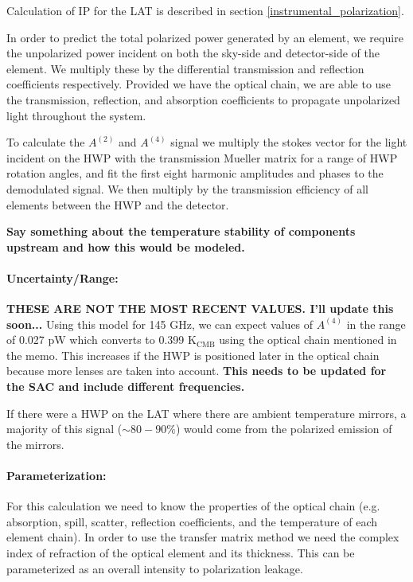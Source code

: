 Calculation of IP for the LAT is described in section \ref{instrumental_polarization}.

In order to predict the total polarized power generated by an element, we require the unpolarized power incident on both the sky-side and detector-side of the element. We multiply these by the differential transmission and reflection coefficients respectively.
Provided we have the optical chain, we are able to use the transmission, reflection, and absorption coefficients to propagate unpolarized light throughout the system.

To calculate the $A^{(2)}$ and $A^{(4)}$ signal we multiply the stokes vector for the light incident on the HWP with the transmission Mueller matrix for a range of HWP rotation angles, and fit the first eight harmonic amplitudes and phases to the demodulated signal. 
We then multiply by the transmission efficiency of all elements between the HWP and the detector.

\textbf{Say something about the temperature stability of components upstream and how this would be modeled.}

\paragraph{Uncertainty/Range:} \textbf{THESE ARE NOT THE MOST RECENT VALUES. I'll update this soon...}
Using this model for 145 GHz, we can expect values of $A^{(4)}$ in the range of 0.027 pW which converts to 0.399 K$_\text{CMB}$ using the optical chain mentioned in the memo. This increases if the HWP is positioned later in the optical chain because more lenses are taken into account.
\textbf{This needs to be updated for the SAC and include different frequencies.}

If there were a HWP on the LAT where there are ambient temperature mirrors, a majority of this signal ($\sim 80-90\%$) would come from the polarized emission of the mirrors.

\paragraph{Parameterization:}
For this calculation we need to know the properties of the optical chain (e.g. absorption, spill, scatter, reflection coefficients, and 
the temperature of each element chain). In order to use the transfer matrix method we need the complex index of refraction of the optical element and its thickness. This can be parameterized as an overall intensity to polarization leakage.


